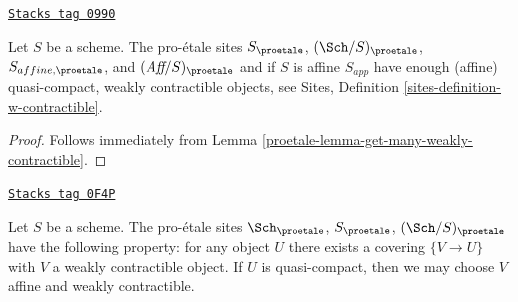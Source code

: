\begin{lemma}
\label{proetale-lemma-proetale-enough-w-contractible}
\href{https://stacks.math.columbia.edu/tag/0990}{\texttt{Stacks tag 0990}}

Let $S$ be a scheme. The pro-\'etale sites
$S_\proetale$, $(\Sch/S)_\proetale$, $S_{affine, \proetale}$, and
$(\textit{Aff}/S)_\proetale$ and if $S$ is affine $S_{app}$
have enough (affine) quasi-compact, weakly contractible
objects, see Sites, Definition \ref{sites-definition-w-contractible}.
\end{lemma}

\begin{proof}

Follows immediately from Lemma \ref{proetale-lemma-get-many-weakly-contractible}.
\end{proof}

\begin{lemma}
\label{proetale-lemma-weakly-contractible-cover}
\href{https://stacks.math.columbia.edu/tag/0F4P}{\texttt{Stacks tag 0F4P}}

Let $S$ be a scheme. The pro-\'etale sites
$\Sch_\proetale$, $S_\proetale$, $(\Sch/S)_\proetale$
have the following property: for any object
$U$ there exists a covering $\{V \to U\}$ with $V$ a
weakly contractible object. If $U$ is quasi-compact, then we
may choose $V$ affine and weakly contractible.
\end{lemma}

